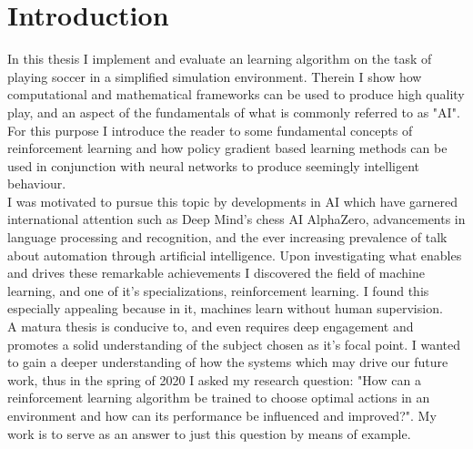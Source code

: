 \chapter{Introduction}\label{chap:einleitung}
In this thesis I implement and evaluate an learning algorithm on the task of playing soccer in a simplified simulation environment. Therein I show how computational and mathematical frameworks can be used to produce high quality play, and an aspect of the fundamentals of what is commonly referred to as "AI". For this purpose I introduce the reader to some fundamental concepts of reinforcement learning and how policy gradient based learning methods can be used in conjunction with neural networks to produce seemingly intelligent behaviour. 
\\ I was motivated to pursue this topic by developments in AI which have garnered international attention such as Deep Mind's chess AI AlphaZero, advancements in language processing and recognition, and the ever increasing prevalence of talk about automation through artificial intelligence. Upon investigating what enables and drives these remarkable achievements I discovered the field of machine learning, and one of it's specializations, reinforcement learning. I found this especially appealing because in it, machines learn without human supervision. 
\\ A matura thesis is conducive to, and even requires deep engagement and promotes a solid understanding of the subject chosen as it's focal point. I wanted to gain a deeper understanding of how the systems which may drive our future work, thus in the spring of 2020 I asked my research question: "How can a reinforcement learning algorithm be trained to choose optimal actions in an environment and how can its performance be influenced and improved?". My work is to serve as an answer to just this question by means of example. 